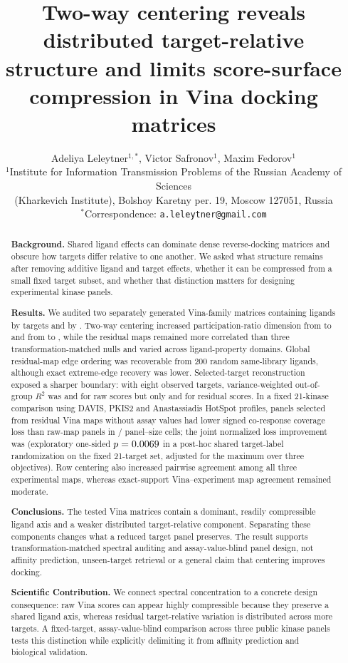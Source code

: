 \documentclass[11pt]{article}
\title{Two-way centering reveals distributed target-relative structure and
limits score-surface compression in Vina docking matrices}
\author{
Adeliya Leleytner$^{1,*}$, Victor Safronov$^{1}$, Maxim Fedorov$^{1}$\\[4pt]
\small $^{1}$Institute for Information Transmission Problems of the Russian Academy of Sciences\\
\small (Kharkevich Institute), Bolshoy Karetny per. 19, Moscow 127051, Russia\\
\small $^{*}$Correspondence: \texttt{a.leleytner@gmail.com}
}
\date{}
\begin{document}
\maketitle

\begin{abstract}
\textbf{Background.}
Shared ligand effects can dominate dense reverse-docking matrices and obscure
how targets differ relative to one another. We asked what structure remains
after removing additive ligand and target effects, whether it can be compressed
from a small fixed target subset, and whether that distinction matters for
designing experimental kinase panels.

\textbf{Results.}
We audited two separately generated Vina-family matrices containing
\DffRows{} ligands by \DffTargets{} targets and \DsRows{} by \DsTargets{}.
Two-way centering increased participation-ratio dimension from \DffRawPR{} to
\DffResidualPR{} and from \DsRawPR{} to \DsResidualPR{}, while the residual
maps remained more correlated than three transformation-matched nulls and
varied across ligand-property domains. Global residual-map edge ordering was
recoverable from 200 random same-library ligands, although exact extreme-edge
recovery was lower. Selected-target reconstruction exposed a sharper boundary:
with eight observed targets, variance-weighted out-of-group $R^2$ was
\DffSelectorRawRtwo{} and \DsSelectorRawRtwo{} for raw scores but only
\DffSelectorResidualRtwo{} and \DsSelectorResidualRtwo{} for residual scores.
In a fixed 21-kinase comparison using DAVIS, PKIS2 and Anastassiadis
HotSpot profiles, panels selected from residual Vina maps without assay values
had lower signed co-response coverage loss than raw-map panels in
\PanelTransferPositiveCells{}/\PanelTransferTotalCells{} panel--size cells; the
joint normalized loss improvement was \PanelTransferJointAUC{}
(exploratory one-sided $p=0.0069{}$ in a post-hoc shared
target-label randomization on the fixed 21-target set, adjusted for the maximum
over three objectives). Row
centering also increased pairwise agreement among all three experimental maps,
whereas exact-support Vina--experiment map agreement remained moderate.

\textbf{Conclusions.}
The tested Vina matrices contain a dominant, readily compressible ligand axis
and a weaker distributed target-relative component. Separating these components
changes what a reduced target panel preserves. The result supports
transformation-matched spectral auditing and assay-value-blind panel design,
not affinity prediction, unseen-target retrieval or a general claim that
centering improves docking.

\medskip\noindent\textbf{Scientific Contribution.}
We connect spectral concentration to a concrete design consequence: raw Vina
scores can appear highly compressible because they preserve a shared ligand
axis, whereas residual target-relative variation is distributed across more
targets. A fixed-target, assay-value-blind comparison across three public kinase
panels tests this distinction while explicitly delimiting it from affinity
prediction and biological validation.
\end{abstract}
\end{document}
